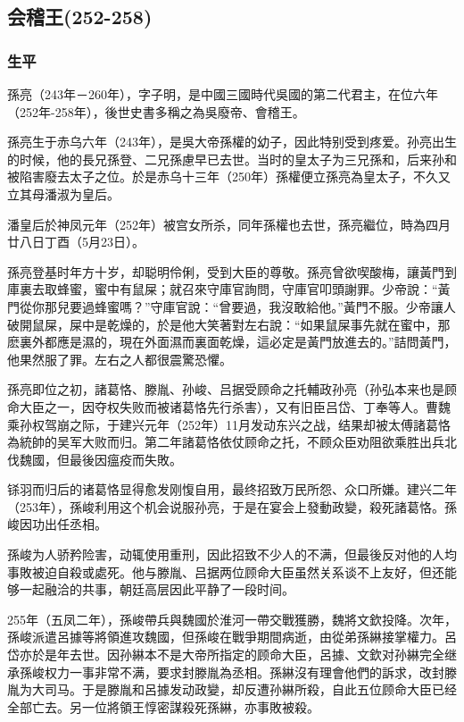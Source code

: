 
\subsection{会稽王\tiny(252-258)}

\subsubsection{生平}

孫亮（243年－260年），字子明，是中國三國時代吳國的第二代君主，在位六年（252年-258年），後世史書多稱之為吳廢帝、會稽王。

孫亮生于赤乌六年（243年），是吳大帝孫權的幼子，因此特别受到疼爱。孙亮出生的时候，他的長兄孫登、二兄孫慮早已去世。当时的皇太子为三兄孫和，后来孙和被陷害廢去太子之位。於是赤乌十三年（250年）孫權便立孫亮為皇太子，不久又立其母潘淑为皇后。

潘皇后於神凤元年（252年）被宫女所杀，同年孫權也去世，孫亮繼位，時為四月廿八日丁酉（5月23日）。

孫亮登基时年方十岁，却聪明伶俐，受到大臣的尊敬。孫亮曾欲喫酸梅，讓黃門到庫裏去取蜂蜜，蜜中有鼠屎；就召來守庫官詢問，守庫官叩頭謝罪。少帝說：“黃門從你那兒要過蜂蜜嗎？”守庫官說：“曾要過，我沒敢給他。”黃門不服。少帝讓人破開鼠屎，屎中是乾燥的，於是他大笑著對左右說：“如果鼠屎事先就在蜜中，那麽裏外都應是濕的，現在外面濕而裏面乾燥，這必定是黃門放進去的。”詰問黃門，他果然服了罪。左右之人都很震驚恐懼。

孫亮即位之初，諸葛恪、滕胤、孙峻、吕据受顾命之托輔政孙亮（孙弘本来也是顾命大臣之一，因夺权失败而被诸葛恪先行杀害），又有旧臣吕岱、丁奉等人。曹魏乘孙权驾崩之际，于建兴元年（252年）11月发动东兴之战，结果却被太傅諸葛恪為統帥的吴军大败而归。第二年諸葛恪依仗顾命之托，不顾众臣劝阻欲乘胜出兵北伐魏國，但最後因瘟疫而失敗。

铩羽而归后的诸葛恪显得愈发刚愎自用，最终招致万民所怨、众口所嫌。建兴二年（253年），孫峻利用这个机会说服孙亮，于是在宴会上發動政變，殺死諸葛恪。孫峻因功出任丞相。

孫峻为人骄矜险害，动辄使用重刑，因此招致不少人的不满，但最後反对他的人均事敗被迫自殺或處死。他与滕胤、吕据两位顾命大臣虽然关系谈不上友好，但还能够一起融洽的共事，朝廷高层因此平静了一段时间。

255年（五凤二年），孫峻帶兵與魏國於淮河一帶交戰獲勝，魏將文欽投降。次年，孫峻派遣呂據等將領進攻魏國，但孫峻在戰爭期間病逝，由從弟孫綝接掌權力。呂岱亦於是年去世。因孙綝本不是大帝所指定的顾命大臣，呂據、文欽对孙綝完全继承孫峻权力一事非常不满，要求封滕胤為丞相。孫綝沒有理會他們的訴求，改封滕胤为大司马。于是滕胤和呂據发动政變，却反遭孙綝所殺，自此五位顾命大臣已经全部亡去。另一位將領王惇密謀殺死孫綝，亦事敗被殺。

